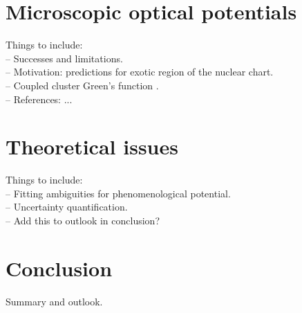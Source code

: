 \documentclass[preprintnumbers,floatfix,aps,prc,preprint,nofootinbib]{revtex4-1}
\begin{document}
\section{Microscopic optical potentials}
\label{sec:microscopic}


Things to include:
\\
-- Successes and limitations.
\\
-- Motivation: predictions for exotic region of the nuclear chart.
\\
-- Coupled cluster Green's function \cite{Rotureau:2016jpf}.
\\
-- References: ...


\section{Theoretical issues}
\label{sec:section_4}


Things to include:
\\
-- Fitting ambiguities for phenomenological potential.
\\
-- Uncertainty quantification.
\\
-- Add this to outlook in conclusion?


\section{Conclusion}
\label{sec:conclusion}


Summary and outlook.





\end{document}
